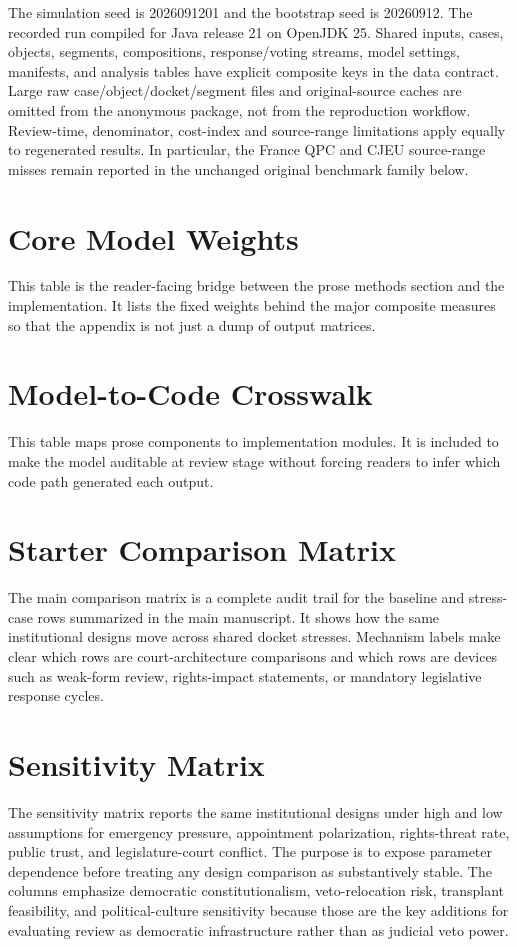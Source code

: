\documentclass[
  journal=small,
  manuscript=research-article,
  year=2026
]{cup-journal}
\begin{document}
The simulation seed is 2026091201 and the bootstrap seed is 20260912. The recorded run compiled for Java release 21 on OpenJDK 25. Shared inputs, cases, objects, segments, compositions, response/voting streams, model settings, manifests, and analysis tables have explicit composite keys in the data contract. Large raw case/object/docket/segment files and original-source caches are omitted from the anonymous package, not from the reproduction workflow. Review-time, denominator, cost-index and source-range limitations apply equally to regenerated results. In particular, the France QPC and CJEU source-range misses remain reported in the unchanged original benchmark family below.

\section*{Core Model Weights}
This table is the reader-facing bridge between the prose methods section and the implementation. It lists the fixed weights behind the major composite measures so that the appendix is not just a dump of output matrices.


\section*{Model-to-Code Crosswalk}
This table maps prose components to implementation modules. It is included to make the model auditable at review stage without forcing readers to infer which code path generated each output.




\section*{Starter Comparison Matrix}
The main comparison matrix is a complete audit trail for the baseline and stress-case rows summarized in the main manuscript. It shows how the same institutional designs move across shared docket stresses. Mechanism labels make clear which rows are court-architecture comparisons and which rows are devices such as weak-form review, rights-impact statements, or mandatory legislative response cycles.


\section*{Sensitivity Matrix}
The sensitivity matrix reports the same institutional designs under high and low assumptions for emergency pressure, appointment polarization, rights-threat rate, public trust, and legislature-court conflict. The purpose is to expose parameter dependence before treating any design comparison as substantively stable. The columns emphasize democratic constitutionalism, veto-relocation risk, transplant feasibility, and political-culture sensitivity because those are the key additions for evaluating review as democratic infrastructure rather than as judicial veto power.

\end{document}
